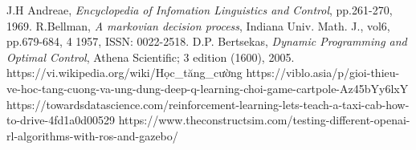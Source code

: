 \documentclass[12pt,a4paper]{report}
\begin{document}
\begin{thebibliography}{}
	 J.H Andreae, \textit{Encyclopedia of Infomation Linguistics and Control}, pp.261-270, 1969.
	 R.Bellman, \textit{A markovian decision process}, Indiana Univ. Math. J., vol6, pp.679-684, 4 1957, ISSN: 0022-2518.
	 D.P. Bertsekas, \textit{Dynamic Programming and Optimal Control}, Athena Scientific; 3 edition (1600), 2005.
	https://vi.wikipedia.org/wiki/Học\_tăng\_cường
	https://viblo.asia/p/gioi-thieu-ve-hoc-tang-cuong-va-ung-dung-deep-q-learning-choi-game-cartpole-Az45bYy6lxY
	https://towardsdatascience.com/reinforcement-learning-lets-teach-a-taxi-cab-how-to-drive-4fd1a0d00529
	https://www.theconstructsim.com/testing-different-openai-rl-algorithms-with-ros-and-gazebo/
\end{thebibliography}
\end{document}
